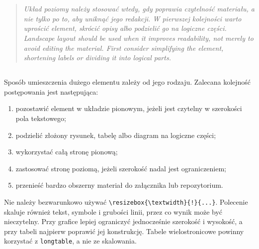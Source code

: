 \chapter{}
\label{app:duze-elementy}

\begin{quote}\itshape
  \ploren
  {Układ poziomy należy stosować wtedy, gdy poprawia czytelność materiału, a nie tylko po to, aby uniknąć jego redakcji. W pierwszej kolejności warto uprościć element, skrócić opisy albo podzielić go na logiczne części.}
  {Landscape layout should be used when it improves readability, not merely to avoid editing the material. First consider simplifying the element, shortening labels or dividing it into logical parts.}
\end{quote}

\section{}

Sposób umieszczenia dużego elementu zależy od jego rodzaju. Zalecana kolejność postępowania jest następująca:
\begin{enumerate}
  \item pozostawić element w układzie pionowym, jeżeli jest czytelny w szerokości pola tekstowego;
  \item podzielić złożony rysunek, tabelę albo diagram na logiczne części;
  \item wykorzystać całą stronę pionową;
  \item zastosować stronę poziomą, jeżeli szerokość nadal jest ograniczeniem;
  \item przenieść bardzo obszerny materiał do załącznika lub repozytorium.
\end{enumerate}

Nie należy bezwarunkowo używać \verb|\resizebox{\textwidth}{!}{...}|. Polecenie skaluje również tekst, symbole i grubości linii, przez co wynik może być nieczytelny. Przy grafice lepiej ograniczyć jednocześnie szerokość i wysokość, a przy tabeli najpierw poprawić jej konstrukcję. Tabele wielostronicowe powinny korzystać z \texttt{longtable}, a nie ze skalowania.

\section{}

